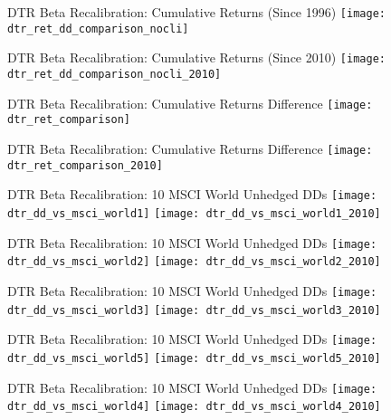 \documentclass{beamer}
\begin{document}
\begin{frame}{DTR Beta Recalibration: Cumulative Returns (Since 1996)}
\texttt{[image: dtr\_ret\_dd\_comparison\_nocli]}
\end{frame}

\begin{frame}{DTR Beta Recalibration: Cumulative Returns (Since 2010)}
\texttt{[image: dtr\_ret\_dd\_comparison\_nocli\_2010]}
\end{frame}

\begin{frame}{DTR Beta Recalibration: Cumulative Returns Difference}
\texttt{[image: dtr\_ret\_comparison]}
\end{frame}

\begin{frame}{DTR Beta Recalibration: Cumulative Returns Difference}
\texttt{[image: dtr\_ret\_comparison\_2010]}
\end{frame}

\begin{frame}{DTR Beta Recalibration: 10 MSCI World Unhedged DDs}
\texttt{[image: dtr\_dd\_vs\_msci\_world1]}
\texttt{[image: dtr\_dd\_vs\_msci\_world1\_2010]}
\end{frame}

\begin{frame}{DTR Beta Recalibration: 10 MSCI World Unhedged DDs}
\texttt{[image: dtr\_dd\_vs\_msci\_world2]}
\texttt{[image: dtr\_dd\_vs\_msci\_world2\_2010]}
\end{frame}

\begin{frame}{DTR Beta Recalibration: 10 MSCI World Unhedged DDs}
\texttt{[image: dtr\_dd\_vs\_msci\_world3]}
\texttt{[image: dtr\_dd\_vs\_msci\_world3\_2010]}
\end{frame}

\begin{frame}{DTR Beta Recalibration: 10 MSCI World Unhedged DDs}
\texttt{[image: dtr\_dd\_vs\_msci\_world5]}
\texttt{[image: dtr\_dd\_vs\_msci\_world5\_2010]}
\end{frame}

\begin{frame}{DTR Beta Recalibration: 10 MSCI World Unhedged DDs}
\texttt{[image: dtr\_dd\_vs\_msci\_world4]}
\texttt{[image: dtr\_dd\_vs\_msci\_world4\_2010]}
\end{frame}
\end{document}
